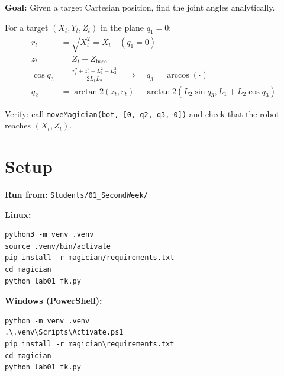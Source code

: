 \documentclass[11pt,a4paper]{article}
\begin{document}
\begin{tcolorbox}[infobox, title={Task 4 (Optional) --- Inverse Kinematics Preview}]
  \textbf{Goal:} Given a target Cartesian position, find the joint angles analytically.

  \smallskip
  For a target $(X_t, Y_t, Z_t)$ in the plane $q_1 = 0$:
  \begin{align*}
    r_t &= \sqrt{X_t^2} = X_t \quad (q_1=0) \\
    z_t &= Z_t - Z_{\text{base}} \\
    \cos q_3 &= \frac{r_t^2 + z_t^2 - L_1^2 - L_2^2}{2 L_1 L_2}
    \quad \Rightarrow \quad q_3 = \arccos(\cdot) \\
    q_2 &= \arctan2(z_t, r_t) - \arctan2(L_2 \sin q_3, L_1 + L_2 \cos q_3)
  \end{align*}

  Verify: call \texttt{moveMagician(bot, [0, q2, q3, 0])} and check that the
  robot reaches $(X_t, Z_t)$.
\end{tcolorbox}

\section{Setup}

\begin{tcolorbox}[setupbox, title={Magician --- Environment Setup}]
\textbf{Run from:} \texttt{Students/01\_SecondWeek/}

\textbf{Linux:}
\begin{lstlisting}[style=BashStyle]
python3 -m venv .venv
source .venv/bin/activate
pip install -r magician/requirements.txt
cd magician
python lab01_fk.py
\end{lstlisting}

\textbf{Windows (PowerShell):}
\begin{lstlisting}[style=BashStyle]
python -m venv .venv
.\.venv\Scripts\Activate.ps1
pip install -r magician\requirements.txt
cd magician
python lab01_fk.py
\end{lstlisting}
\end{tcolorbox}

\vspace{6pt}
\end{document}
